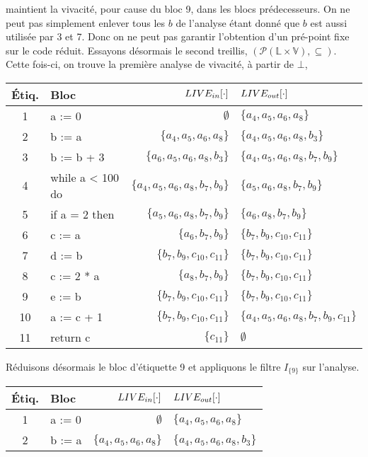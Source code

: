 \documentclass[a4paper, 10pt]{article}
\begin{document}
\begin{example}
maintient la vivacité, pour cause du bloc 9, dans les blocs prédecesseurs. On ne peut pas simplement enlever tous les $b$
de l'analyse étant donné que $b$ est aussi utilisée par 3 et 7. Donc on ne peut pas garantir l'obtention d'un
pré-point fixe sur le code réduit. Essayons désormais le second treillis, 
$(\mathcal{P}(\mathbb{L} \times \mathbb{V}), \subseteq)$. Cette fois-ci, on trouve la première analyse de vivacité, à partir
de $\bot$,
\begin{center}
	\begin{tabular}{||c|l|r|l||}
	\hline
	Étiq. & Bloc & $LIVE_{in}[\cdot]$ & $LIVE_{out}[\cdot]$ \\
	\hline
	1 & a := 0 & $\emptyset$ & $\{a_4, a_5, a_6, a_8\}$\\
	2 & b := a & $\{a_4, a_5, a_6, a_8\}$ & $\{a_4, a_5, a_6, a_8, b_3\}$\\
	3 & b := b + 3 & $\{a_6, a_5, a_6, a_8, b_3\}$ & $\{a_4, a_5, a_6, a_8, b_7, b_9\}$\\
	4 & while a < 100 do & $\{a_4, a_5, a_6, a_8, b_7, b_9\}$ & $\{a_5, a_6, a_8, b_7, b_9\}$\\
	5 & if a = 2 then & $\{a_5, a_6, a_8, b_7, b_9\}$ & $\{a_6, a_8, b_7, b_9\}$\\
	6 & c := a & $\{a_6, b_7, b_9\}$ & $\{b_7, b_9, c_{10}, c_{11}\}$\\
	7 & d := b & $\{b_7, b_9, c_{10}, c_{11}\}$ & $\{b_7, b_9, c_{10}, c_{11}\}$\\
	8 & c := 2 * a & $\{a_8, b_7, b_9\}$ & $\{b_7, b_9, c_{10}, c_{11}\}$\\
	9 & e := b & $\{b_7, b_9, c_{10}, c_{11}\}$ & $\{b_7, b_9, c_{10}, c_{11}\}$\\
	10 & a := c + 1 & $\{b_7, b_9, c_{10}, c_{11}\}$ & $\{a_4, a_5, a_6, a_8, b_7, b_9, c_{11}\}$\\
	11 & return c & $\{c_{11}\}$ & $\emptyset$\\
	\hline
	\end{tabular}
\end{center}
Réduisons désormais le bloc d'étiquette 9 et appliquons le filtre $I_{\{9\}}$ sur l'analyse.
\begin{center}
	\begin{tabular}{||c|l|r|l||}
	\hline
	Étiq. & Bloc & $LIVE_{in}[\cdot]$ & $LIVE_{out}[\cdot]$ \\
	\hline
	1 & a := 0 & $\emptyset$ & $\{a_4, a_5, a_6, a_8\}$\\
	2 & b := a & $\{a_4, a_5, a_6, a_8\}$ & $\{a_4, a_5, a_6, a_8, b_3\}$\\

\end{tabular}
\end{center}
\end{example}
\end{document}
